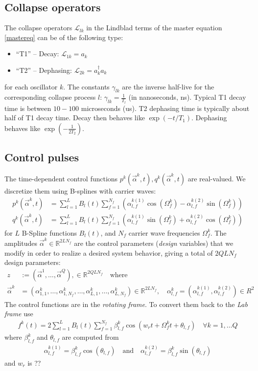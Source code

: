 \documentclass[letterpaper]{article}
\newcommand{\Ell}{\mathcal{L}}
\newcommand{\R}{\mathds{R}}
\begin{document}
\subsection*{Collapse operators}
The collapse operators $\Ell_{lk}$ in the Lindblad terms of the master equation \eqref{mastereq} can be of the following type:
\begin{itemize}
  \item ``T1'' -- Decay: $\Ell_{1k} = a_k$
  \item ``T2'' -- Dephasing: $\Ell_{2k} = a_k^{\dagger}a_k$
\end{itemize}
for each oscillator $k$. The constants $\gamma_{lk}$ are the inverse half-live for the corresponding collapse process $l$: $\gamma_{lk} = {\frac{1}{T_l}}$ (in nanoseconds, ns). Typical T1 decay time is between $10-100$ microseconds (us). T2 dephasing time is typically about half of T1 decay time. Decay then behaves like $\exp(-t/{T_1})$. Dephasing behaves like $\exp(-\frac{1}{2{T_2}})$.

\subsection*{Control pulses}
The time-dependent control functions $p^k(\vec{\alpha}^k,t), q^k(\vec{\alpha}^k,t)$ are real-valued. We discretize them using B-splines with carrier waves:
\begin{align}
  p^k(\vec{\alpha}^k,t) &= \sum_{l=1}^L B_l(t) \sum_{f=1}^{N_f} \left(\alpha^{k (1)}_{l,f} \cos(\Omega_f^k) - \alpha^{k (2)}_{l,f} \sin(\Omega_f^k) \right) \\
  q^k(\vec{\alpha}^k,t) &= \sum_{l=1}^L B_l(t) \sum_{f=1}^{N_f} \left( \alpha^{k (1)}_{l,f} \sin(\Omega_f^k) + \alpha^{k (2)}_{l,f} \cos(\Omega_f^k) \right)
\end{align}
for $L$ B-Spline functions $B_l(t)$, and $N_f$ carrier wave frequencies $\Omega_f^k$. The amplitudes $\vec{\alpha}^k \in \R^{2LN_f}$ are the control parameters (\textit{design} variables) that we modify in order to realize a desired system behavior, giving a total of $2QLN_f$ design parameters:
\begin{align}
  z &:= \left( \vec{\alpha}^1, \dots, \vec{\alpha}^Q \right), \in \mathds{R}^{2QLN_f} \quad \text{where}\\
  \vec{\alpha}^k &= \left( \alpha_{1,1}^k,\dots, \alpha_{1,N_f}^k, \dots, \alpha_{L,1}^{k}, \dots, \alpha_{L,N_f}^k \right) \in \R^{2LN_f}, \quad \alpha_{l,f}^k = \left(\alpha_{l,f}^{k(1)}, \alpha_{l,f}^{k(2)} \right) \in R^2
\end{align}
The control functions are in the \textit{rotating frame}. To convert them back to the \textit{Lab frame} use
\begin{align}
  f^k(t) = 2 \sum_{l=1}^L B_l(t) \sum_{f=1}^{N_f} \beta_{l,f}^k \cos(w_r t + \Omega_f^k t + \theta_{l,f}) \quad \forall k=1,\dots Q
\end{align}
where $\beta_{l,f}^k$ and $\theta_{l,f}$ are computed from
\begin{align}
  \alpha_{l,f}^{k(1)} = \beta_{l,f}^k \cos(\theta_{l,f}) \quad \text{and} \quad \alpha_{l,f}^{k(2)} = \beta_{l,f}^k \sin(\theta_{l,f})
\end{align}
and $w_r$ is ??
\end{document}
